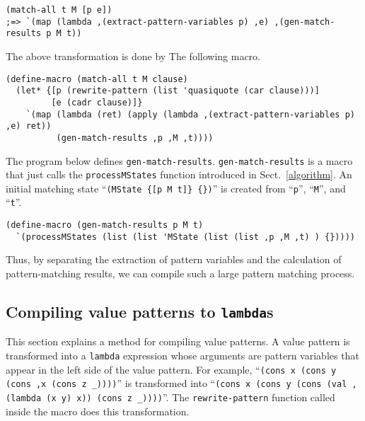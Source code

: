 \documentclass[acmlarge]{acmart}
\begin{document}
\begin{lstlisting}[language=egison]
(match-all t M [p e])
;=> `(map (lambda ,(extract-pattern-variables p) ,e) ,(gen-match-results p M t))
\end{lstlisting}

\noindent The above transformation is done by The following macro.

\begin{lstlisting}[language=egison]
(define-macro (match-all t M clause)
  (let* {[p (rewrite-pattern (list 'quasiquote (car clause)))]
         [e (cadr clause)]}
    `(map (lambda (ret) (apply (lambda ,(extract-pattern-variables p) ,e) ret))
          (gen-match-results ,p ,M ,t))))
\end{lstlisting}

\noindent The program below defines \texttt{gen-match-results}.
\texttt{gen-match-results} is a macro that just calls the \texttt{processMStates} function introduced in Sect.~\ref{algorithm}.
An initial matching state ``\verb|(MState {[p M t]} {})|'' is created from ``\texttt{p}'', ``\texttt{M}'', and ``\texttt{t}''.

\begin{lstlisting}[language=egison]
(define-macro (gen-match-results p M t)
  `(processMStates (list (list 'MState (list (list ,p ,M ,t) ) {}))))
\end{lstlisting}

\medskip

Thus, by separating the extraction of pattern variables and the calculation of pattern-matching results, we can compile such a large pattern matching process.


\subsection{Compiling value patterns to \texttt{lambda}s}\label{method-val-pat}

This section explains a method for compiling value patterns.
A value pattern is transformed into a \texttt{lambda} expression whose arguments are pattern variables that appear in the left side of the value pattern.
For example, ``\texttt{(cons x (cons y (cons ,x (cons z _))))}'' is transformed into ``\texttt{(cons x (cons y (cons (val ,(lambda (x y) x)) (cons z _))))}''.
The \texttt{rewrite-pattern} function called inside the macro does this transformation.
\end{document}
